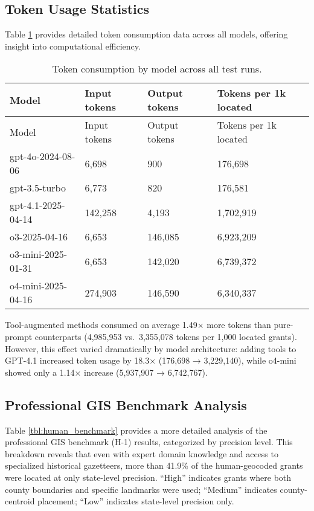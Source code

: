 \subsection{Token Usage
Statistics}\label{b.5-token-usage-statistics}

Table \ref{tbl:token_usage} provides detailed token consumption data
across all models, offering insight into computational efficiency.

\begin{longtable}[]{@{}llll@{}}
\caption{\label{tbl:token_usage}Token consumption by model across all
test runs.}\tabularnewline
\toprule\noalign{}
Model & Input tokens & Output tokens & Tokens per 1k located \\
\midrule\noalign{}
\endfirsthead
\toprule\noalign{}
Model & Input tokens & Output tokens & Tokens per 1k located \\
\midrule\noalign{}
\endhead
\bottomrule\noalign{}
\endlastfoot
gpt-4o-2024-08-06 & 6,698 & 900 & 176,698 \\
gpt-3.5-turbo & 6,773 & 820 & 176,581 \\
gpt-4.1-2025-04-14 & 142,258 & 4,193 & 1,702,919 \\
o3-2025-04-16 & 6,653 & 146,085 & 6,923,209 \\
o3-mini-2025-01-31 & 6,653 & 142,020 & 6,739,372 \\
o4-mini-2025-04-16 & 274,903 & 146,590 & 6,340,337 \\
\end{longtable}

Tool-augmented methods consumed on average 1.49× more tokens than
pure-prompt counterparts (4,985,953 vs.~3,355,078 tokens per 1,000
located grants). However, this effect varied dramatically by model
architecture: adding tools to GPT-4.1 increased token usage by 18.3×
(176,698 → 3,229,140), while o4-mini showed only a 1.14× increase
(5,937,907 → 6,742,767).

\subsection{Professional GIS Benchmark
Analysis}\label{b.6-professional-gis-benchmark-analysis}

Table \ref{tbl:human_benchmark} provides a more detailed analysis of the
professional GIS benchmark (H-1) \citep{Bashorun2025_gis} results,
categorized by precision level. This breakdown reveals that even with
expert domain knowledge and access to specialized historical gazetteers,
more than 41.9\% of the human-geocoded grants were located at only
state-level precision. ``High'' indicates grants where both county
boundaries and specific landmarks were used; ``Medium'' indicates
county-centroid placement; ``Low'' indicates state-level precision only.

